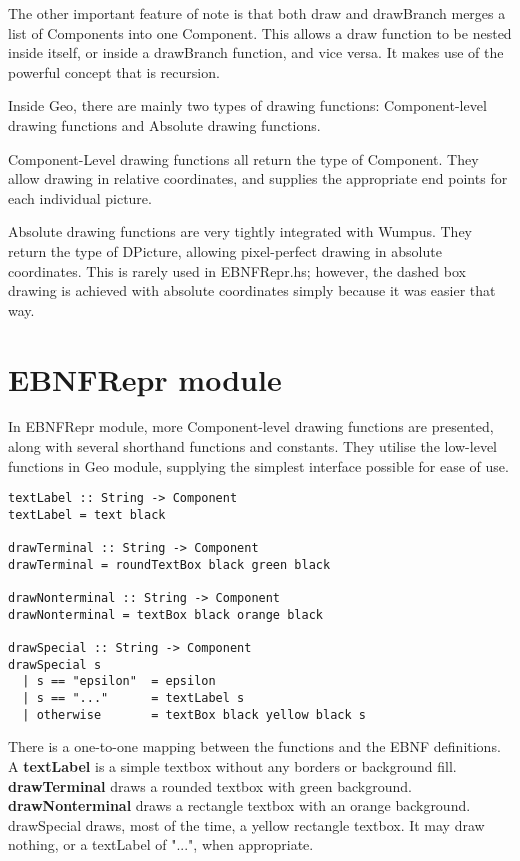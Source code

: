 \documentclass[a4paper]{article}
\begin{document}
The other important feature of note is that both draw and drawBranch merges a list of Components into one Component. This allows a draw function to be nested inside itself, or inside a drawBranch function, and vice versa. It makes use of the powerful concept that is recursion.

Inside Geo, there are mainly two types of drawing functions: Component-level drawing functions and Absolute drawing functions.

Component-Level drawing functions all return the type of Component. They allow drawing in relative coordinates, and supplies the appropriate end points for each individual picture.

Absolute drawing functions are very tightly integrated with Wumpus. They return the type of DPicture, allowing pixel-perfect drawing in absolute coordinates. This is rarely used in EBNFRepr.hs; however, the dashed box drawing is achieved with absolute coordinates simply because it was easier that way.

\section{EBNFRepr module}
In EBNFRepr module, more Component-level drawing functions are presented, along with several shorthand functions and constants. They utilise the low-level functions in Geo module, supplying the simplest interface possible for ease of use.

\begin{verbatim}
textLabel :: String -> Component
textLabel = text black

drawTerminal :: String -> Component
drawTerminal = roundTextBox black green black

drawNonterminal :: String -> Component
drawNonterminal = textBox black orange black

drawSpecial :: String -> Component
drawSpecial s 
  | s == "epsilon"  = epsilon
  | s == "..."      = textLabel s
  | otherwise       = textBox black yellow black s
\end{verbatim}

There is a one-to-one mapping between the functions and the EBNF definitions. A \textbf{textLabel} is a simple textbox without any borders or background fill. \textbf{drawTerminal} draws a rounded textbox with green background. \textbf{drawNonterminal} draws a rectangle textbox with an orange background. drawSpecial draws, most of the time, a yellow rectangle textbox. It may draw nothing, or a textLabel of "...", when appropriate.
\end{document}
